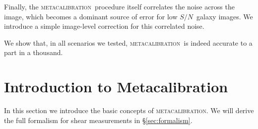 \documentclass[iop]{emulateapj}
\newcommand{\snr}{$S/N$}
\newcommand{\mcal}{\textsc{metacalibration}}
\begin{document}

Finally, the \mcal\ procedure itself correlates the noise across the image,
which becomes a dominant source of error for low \snr\ galaxy images.  We
introduce a simple image-level correction for this correlated noise.

We show that, in all scenarios we tested, \mcal\ is indeed accurate to a part
in a thousand.

\section{Introduction to Metacalibration} \label{sec:mcal}

In this section we introduce the basic concepts of \mcal. We will derive the
full formalism for shear measurements in \S \ref{sec:formalism}.
\end{document}
